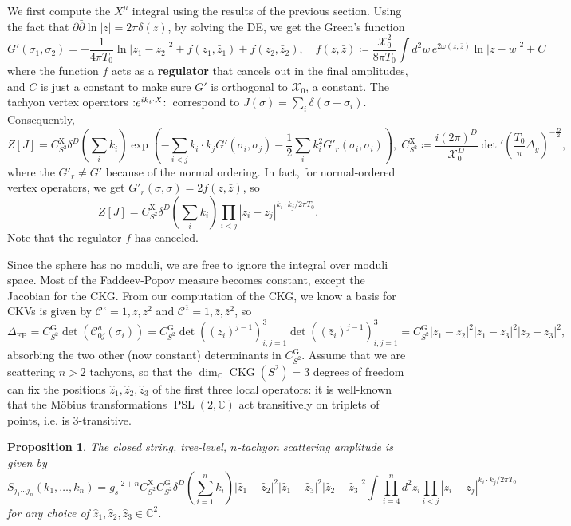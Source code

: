\documentclass{report}
\theoremstyle{plain}
\newtheorem{proposition}[theorem]{Proposition}
\theoremstyle{definition}
\theoremstyle{remark}
\newcommand{\di}{\partial}
\newcommand{\NO}[1]{\vcentcolon\mathrel{#1}\vcentcolon\,}
\newcommand{\bC}{\mathbb{C}}
\newcommand{\cC}{\mathcal{C}}
\newcommand{\cX}{\mathcal{X}}
\DeclareMathOperator{\PSL}{PSL}
\DeclareMathOperator{\CKG}{CKG}
\newcommand{\bz}{\bar{z}}
\newcommand{\bdi}{\bar{\di}}
\begin{document}
We first compute the $X^\mu$ integral using the results of the
previous section. Using the fact that $\di \bdi \ln |z| = 2\pi
\delta(z)$, by solving the DE, we get the Green's function
\[ G'(\sigma_1, \sigma_2) = -\frac{1}{4\pi T_0} \ln |z_1 - z_2|^2 + f(z_1, \bz_1) + f(z_2, \bz_2), \quad f(z, \bz) \coloneqq \frac{\cX_0^2}{8\pi T_0} \int d^2 w \, e^{2\omega(z,\bz)} \ln |z - w|^2 + C \]
where the function $f$ acts as a {\bf regulator} that cancels out in
the final amplitudes, and $C$ is just a constant to make sure $G'$ is
orthogonal to $\cX_0$, a constant. The tachyon vertex operators
$\NO{e^{ik_i\cdot X}}$ correspond to $J(\sigma) = \sum_i \delta(\sigma
- \sigma_i)$. Consequently,
\[ Z[J] = C_{S^2}^{\text{X}} \delta^D(\sum_i k_i) \exp\left(-\sum_{i < j} k_i \cdot k_j G'(\sigma_i, \sigma_j) - \frac{1}{2}\sum_i k_i^2 G'_r(\sigma_i, \sigma_i)\right), \; C_{S^2}^{\text{X}} \coloneqq \frac{i(2\pi)^D}{\cX_0^D} \det\nolimits' \left(\frac{T_0}{\pi}\Delta_g\right)^{-\frac{D}{2}}, \]
where the $G'_r \neq G'$ because of the normal ordering. In fact, for
normal-ordered vertex operators, we get $G'_r(\sigma, \sigma) = 2f(z,
\bz)$, so
\[ Z[J] = C_{S^2}^{\text{X}} \delta^D\left(\sum_i k_i\right) \prod_{i<j} |z_i - z_j|^{k_i \cdot k_j/2\pi T_0}. \]
Note that the regulator $f$ has canceled. 

Since the sphere has no moduli, we are free to ignore the integral
over moduli space. Most of the Faddeev-Popov measure becomes constant,
except the Jacobian for the CKG. From
our computation of the CKG, we know a basis for CKVs is given by
$\cC^z = 1, z, z^2$ and $\cC^{\bz} = 1, \bz, \bz^2$, so
\[ \Delta_{\text{FP}} = C_{S^2}^{\text{G}} \det(\cC^a_{0j}(\sigma_i)) = C_{S^2}^{\text{G}} \det((z_i)^{j-1})_{i,j=1}^3 \det((\bz_i)^{j-1})_{i,j=1}^3 = C_{S^2}^{\text{G}} |z_1 - z_2|^2 |z_1 - z_3|^2 |z_2 - z_3|^2, \]
absorbing the two other (now constant) determinants in
$C_{S^2}^{\text{G}}$. Assume that we are scattering $n > 2$ tachyons,
so that the $\dim_{\bC} \CKG(S^2) = 3$ degrees of freedom can fix the
positions $\hat{z}_1, \hat{z}_2, \hat{z}_3$ of the first three local
operators: it is well-known that the M\"obius transformations $\PSL(2,
\bC)$ act transitively on triplets of points, i.e. is $3$-transitive.

\begin{proposition}
  The closed string, tree-level, $n$-tachyon scattering amplitude is
  given by
  \[ S_{j_1 \cdots j_n}(k_1, \ldots, k_n) = g_s^{-2+n} C_{S^2}^{\text{X}} C_{S^2}^{\text{G}} \delta^D\left(\sum_{i=1}^n k_i\right) |\hat{z}_1 - \hat{z}_2|^2 |\hat{z}_1 - \hat{z}_3|^2 |\hat{z}_2 - \hat{z}_3|^2 \int \prod_{i=4}^n d^2 z_i \prod_{i<j} |z_i - z_j|^{k_i \cdot k_j/2\pi T_0} \]
  for any choice of $\hat{z}_1, \hat{z}_2, \hat{z}_3 \in \bC^2$.
\end{proposition}
\end{document}
